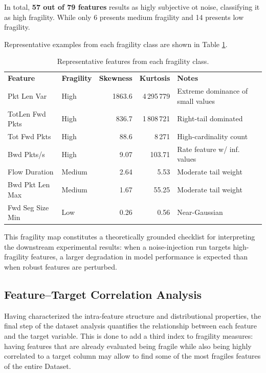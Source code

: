\documentclass[../main.tex]{subfiles}
\begin{document}
In total, \textbf{57 out of 79 features} results as higly subjective ot noise, classifying it as high fragility. While only 6 presents medium fragility and 14 presents low fragility.

Representative examples from each fragility class are shown in Table \ref{tab:fragility-examples}.

\begin{table}[H]
  \centering
  \caption{Representative features from each fragility class.}
  \label{tab:fragility-examples}
  \small
  \begin{tabular}{llrrl}
    \textbf{Feature} & \textbf{Fragility} & \textbf{Skewness} & \textbf{Kurtosis} & \textbf{Notes} \\
    Pkt Len Var            & High    & 1863.6  & 4\,295\,779 & Extreme dominance of small values \\
    TotLen Fwd Pkts        & High    & 836.7   & 1\,808\,721 & Right-tail dominated \\
    Tot Fwd Pkts           & High    & 88.6    & 8\,271      & High-cardinality count \\
    Bwd Pkts/s             & High    & 9.07    & 103.71      & Rate feature w/ inf. values \\
    Flow Duration          & Medium  & 2.64    & 5.53        & Moderate tail weight \\
    Bwd Pkt Len Max        & Medium  & 1.67    & 55.25       & Moderate tail weight \\
    Fwd Seg Size Min       & Low     & 0.26    & 0.56        & Near-Gaussian \\
  \end{tabular}
\end{table}

This fragility map constitutes a theoretically grounded checklist for interpreting the downstream experimental results: when a noise-injection run targets high-fragility features, a larger degradation in model performance is expected than when robust features are perturbed.

\newpage
\subsection{Feature–Target Correlation Analysis}
\label{sec:feat-target-corr}

Having characterized the intra-feature structure and distributional properties, the final step of the dataset analysis quantifies the relationship between each feature and the target variable. This is done to add a third index to fragility measures: having features that are already evaluated being fragile while also being highly correlated to a target column may allow to find some of the most fragiles features of the entire Dataset. 
\end{document}

